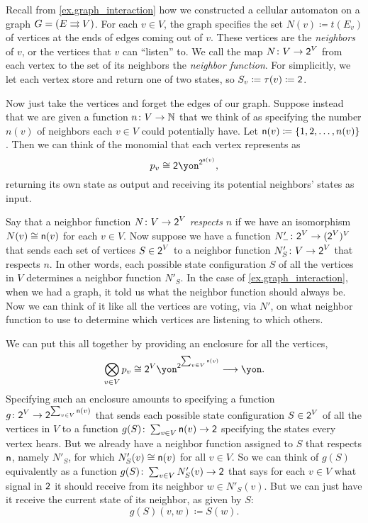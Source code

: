 \documentclass[Book-Poly]{subfiles}
\begin{document}
\begin{example}\label{ex.cell_auto_vote_interaction}
Recall from \cref{ex.graph_interaction} how we constructed a cellular automaton on a graph $G=(E\rightrightarrows V)$.
For each $v\in V$, the graph specifies the set $N(v)\coloneqq t(E_v)$ of vertices at the ends of edges coming out of $v$.
These vertices are the \emph{neighbors} of $v$, or the vertices that $v$ can ``listen'' to.
We call the map $N\colon V\to\textsf{2}^V$ from each vertex to the set of its neighbors the \emph{neighbor function}.
For simplicitly, we let each vertex store and return one of two states, so $S_v\coloneqq\tau(v)\coloneqq\textsf{2}$.

Now just take the vertices and forget the edges of our graph.
Suppose instead that we are given a function $n\colon V\to\mathbb{N}$ that we think of as specifying the number $n(v)$ of neighbors each $v\in V$ could potentially have.
Let $\mathsf{n}(v)\coloneqq\{1,2,\ldots,n(v)\}$.
Then we can think of the monomial that each vertex represents as
\[
    p_v\iso\2\yon^{\2^{\ord{n}(v)}},
\]
returning its own state as output and receiving its potential neighbors' states as input.

Say that a neighbor function $N\colon V\to\textsf{2}^V$ \emph{respects} $n$ if we have an isomorphism $N(v)\cong\mathsf{n}(v)$ for each $v\in V$.
Now suppose we have a function $N'_-\colon \textsf{2}^V\to (\textsf{2}^V)^V$ that sends each set of vertices $S\in\textsf{2}^V$ to a neighbor function $N'_S\colon V\to \textsf{2}^V$ that respects $n$.
In other words, each possible state configuration $S$ of all the vertices in $V$ determines a neighbor function $N'_S$.
In the case of \cref{ex.graph_interaction}, when we had a graph, it told us what the neighbor function should always be.
Now we can think of it like all the vertices are voting, via $N'$, on what neighbor function to use to determine which vertices are listening to which others.

We can put this all together by providing an enclosure for all the vertices,
\begin{equation}\label{eqn.polymap_misc9237}
    \bigotimes_{v\in V}p_v\cong\2^V\yon^{\2^{\sum_{v\in V}\ord{n}(v)}}\too\yon.
\end{equation}
Specifying such an enclosure amounts to specifying a function $g\colon \textsf{2}^V\to\textsf{2}^{\sum_{v\in V}\mathsf{n}(v)}$ that sends each possible state configuration $S\in\textsf{2}^V$ of all the vertices in $V$ to a function $g(S)\colon\sum_{v\in V}\mathsf{n}(v)\to\textsf{2}$ specifying the states every vertex hears.
But we already have a neighbor function assigned to $S$ that respects $\mathsf{n}$, namely $N'_S$, for which $N'_S(v)\cong\mathsf{n}(v)$ for all $v\in V$.
So we can think of $g(S)$ equivalently as a function $g(S)\colon\sum_{v\in V}N'_S(v)\to\textsf{2}$ that says for each $v\in V$ what signal in $\textsf{2}$ it should receive from its neighbor $w\in N'_S(v)$.
But we can just have it receive the current state of its neighbor, as given by $S$:
\[
    g(S)(v,w)\coloneqq S(w).
\]


\end{example}
\end{document}
